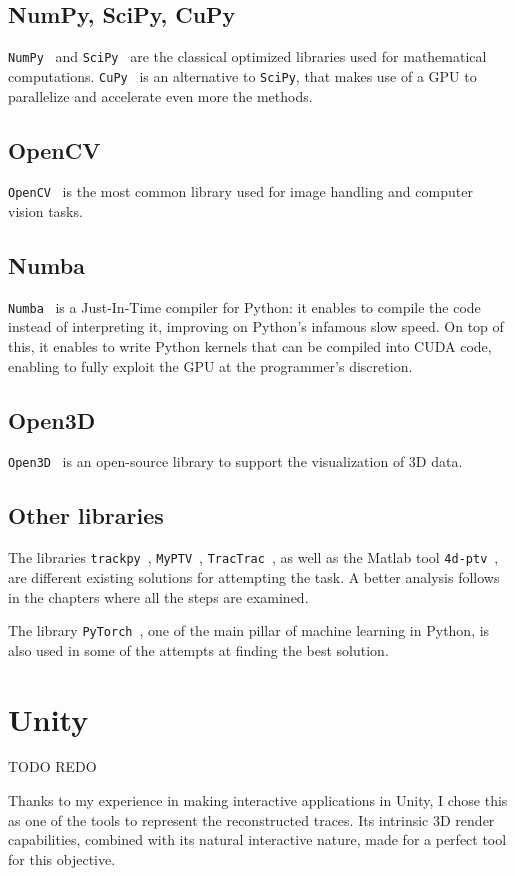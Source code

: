 \subsection{NumPy, SciPy, CuPy}

\texttt{NumPy}~\cite{numpy} and \texttt{SciPy}~\cite{scipy} are the classical optimized libraries used for mathematical computations.
\texttt{CuPy}~\cite{cupy} is an alternative to \texttt{SciPy}, that makes use of a GPU to parallelize and accelerate even more the methods.

\subsection{OpenCV}

\texttt{OpenCV}~\cite{opencv} is the most common library used for image handling and computer vision tasks.

\subsection{Numba}

\texttt{Numba}~\cite{numba} is a Just-In-Time compiler for Python: it enables to compile the code instead of interpreting it, improving on Python's infamous slow speed.
On top of this, it enables to write Python kernels that can be compiled into CUDA code, enabling to fully exploit the GPU at the programmer's discretion.

\subsection{Open3D}

\texttt{Open3D}~\cite{open3d} is an open-source library to support the visualization of 3D data.

\subsection{Other libraries}

The libraries \texttt{trackpy}~\cite{trackpy}, \texttt{MyPTV}~\cite{myptv}, \texttt{TracTrac}~\cite{tractrac}, as well as the Matlab tool \texttt{4d-ptv}~\cite{fourdptv}, are different existing solutions for attempting the task. A better analysis follows in the chapters where all the steps are examined.

The library \texttt{PyTorch}~\cite{pytorch}, one of the main pillar of machine learning in Python, is also used in some of the attempts at finding the best solution.

\section{Unity}

TODO REDO

Thanks to my experience in making interactive applications in Unity, I chose this as one of the tools to represent the reconstructed traces.
Its intrinsic 3D render capabilities, combined with its natural interactive nature, made for a perfect tool for this objective.
